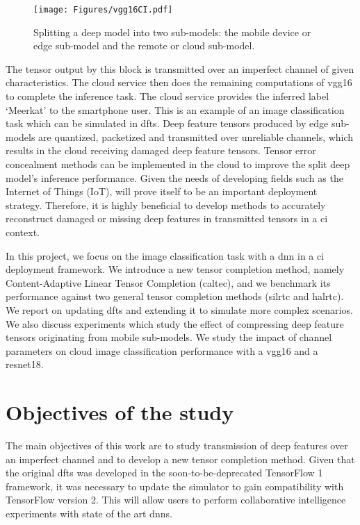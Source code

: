 \begin{figure}[H]
	\centering
	\texttt{[image: Figures/vgg16CI.pdf]}
	\caption{Splitting a deep model into two sub-models: the mobile device or edge sub-model and the remote or cloud sub-model.}
	\label{fig:splitting}
\end{figure}

The tensor output by this block is transmitted over an imperfect channel of given characteristics. The cloud service then does the remaining computations of \gls{vgg16} to complete the inference task. The cloud service provides the inferred label `Meerkat' to the smartphone user. This is an example of an image classification task which can be simulated in \gls{dfts}. Deep feature tensors produced by edge sub-models are quantized, packetized and transmitted over unreliable channels, which results in the cloud receiving damaged deep feature tensors. Tensor error concealment methods can be implemented in the cloud to improve the split deep model's inference performance. Given the needs of developing fields such as the Internet of Things (IoT),  will prove itself to be an important deployment strategy. Therefore, it is highly beneficial to develop methods to accurately reconstruct damaged or missing deep features in transmitted tensors in a \gls{ci} context. 

In this project, we focus on the image classification task with a \gls{dnn} in a \gls{ci} deployment framework. We introduce a new tensor completion method, namely Content-Adaptive Linear Tensor Completion (\gls{caltec}), and we benchmark its performance against two general tensor completion methods (\gls{silrtc} and \gls{halrtc}). We report on updating \gls{dfts} and extending it to simulate more complex scenarios. We also discuss experiments which study the effect of compressing deep feature tensors originating from mobile sub-models. We study the impact of channel parameters on cloud image classification performance with a \gls{vgg16} and a \gls{resnet18}.


\section{Objectives of the study}
The main objectives of this work are to study transmission of deep features over an imperfect channel and to develop a new tensor completion method. Given that the original \gls{dfts} was developed in the soon-to-be-deprecated TensorFlow 1 framework, it was necessary to update the simulator to gain compatibility with TensorFlow version 2. This will allow users to perform collaborative intelligence experiments with state of the art \gls{dnn}s. 

